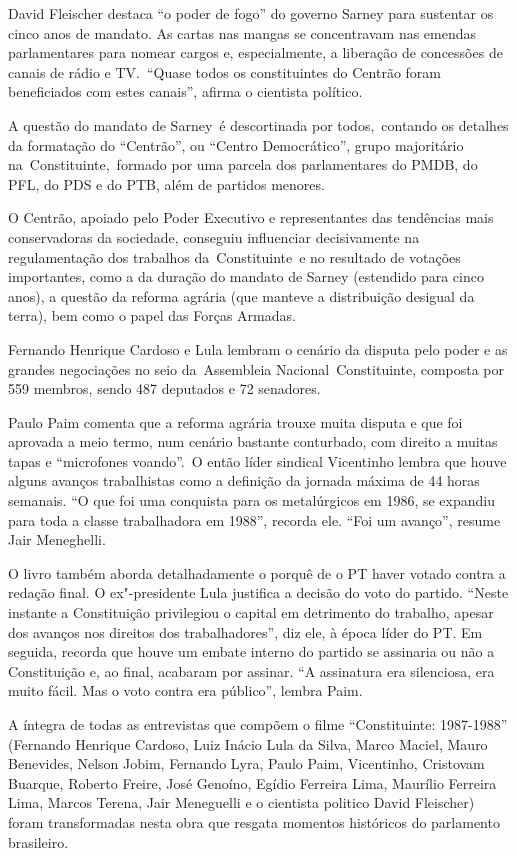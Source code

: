 David Fleischer destaca ``o poder de fogo'' do governo Sarney para
sustentar os cinco anos de mandato. As cartas nas mangas se concentravam
nas emendas parlamentares para nomear cargos e, especialmente, a
liberação de concessões de canais de rádio e TV.~``Quase todos os
constituintes do Centrão foram beneficiados com estes canais'', afirma o
cientista político.

A questão do mandato de Sarney~é descortinada por todos,~contando os
detalhes da formatação do ``Centrão'', ou ``Centro Democrático'', grupo
majoritário na~Constituinte,~formado por uma parcela dos parlamentares
do PMDB, do PFL, do PDS e do PTB, além de partidos menores.

O Centrão, apoiado pelo Poder Executivo e representantes das tendências
mais conservadoras da sociedade, conseguiu influenciar decisivamente na
regulamentação dos trabalhos da~Constituinte~e no resultado de votações
importantes, como a da duração do mandato de Sarney (estendido para
cinco anos), a questão da reforma agrária (que manteve a distribuição
desigual da terra), bem como o papel das Forças Armadas.

Fernando Henrique Cardoso e Lula lembram o cenário da disputa pelo poder
e as grandes negociações no seio da~Assembleia Nacional~Constituinte,
composta por 559 membros, sendo 487 deputados e 72 senadores.

Paulo Paim comenta que a reforma agrária trouxe muita disputa e que foi
aprovada a meio termo, num cenário bastante conturbado, com direito a
muitas tapas e ``microfones voando''.~O então líder sindical Vicentinho
lembra que houve alguns avanços trabalhistas como a definição da jornada
máxima de 44 horas semanais. ``O que foi uma conquista para os
metalúrgicos em 1986, se expandiu para toda a classe trabalhadora em
1988'', recorda ele. ``Foi um avanço'', resume Jair Meneghelli.

O livro também aborda detalhadamente o porquê de o PT haver votado
contra a redação final. O ex"-presidente Lula justifica a decisão do voto
do partido. ``Neste instante a Constituição privilegiou o capital em
detrimento do trabalho, apesar dos avanços nos direitos dos
trabalhadores'', diz ele, à época líder do PT. Em seguida, recorda que
houve um embate interno do partido se assinaria ou não a Constituição e,
ao final, acabaram por assinar. ``A assinatura era silenciosa, era muito
fácil. Mas o voto contra era público'', lembra Paim.

A íntegra de todas as entrevistas que compõem o filme ``Constituinte:
1987-1988'' (Fernando Henrique Cardoso, Luiz Inácio Lula da Silva, Marco
Maciel, Mauro Benevides, Nelson Jobim, Fernando Lyra, Paulo Paim,
Vicentinho, Cristovam Buarque, Roberto Freire, José Genoíno, Egídio
Ferreira Lima, Maurílio Ferreira Lima, Marcos Terena, Jair Meneguelli e
o cientista politico David Fleischer) foram transformadas nesta obra que
resgata momentos históricos do parlamento brasileiro.

